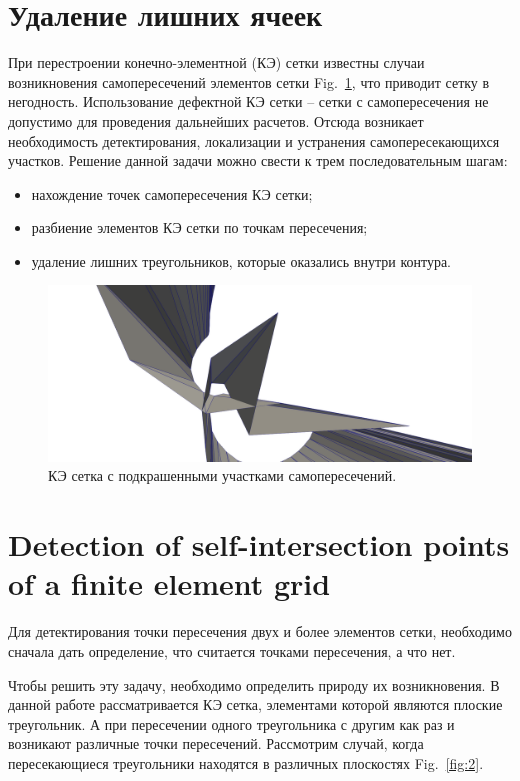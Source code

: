 \documentclass[
11pt,%
tightenlines,%
twoside,%
onecolumn,%
nofloats,%
nobibnotes,%
nofootinbib,%
superscriptaddress,%
noshowpacs,%
centertags]%
{revtex4}
\begin{document}
\section{Удаление лишних ячеек}

При перестроении конечно-элементной (КЭ) сетки известны случаи возникновения самопересечений элементов сетки Fig.~\ref{fig:1}, что приводит сетку в негодность. Использование дефектной КЭ сетки – сетки с самопересечения не допустимо для проведения дальнейших расчетов. Отсюда возникает необходимость детектирования, локализации и устранения самопересекающихся участков.
Решение данной задачи можно свести к трем последовательным шагам:

\begin{itemize}
  \item нахождение точек самопересечения КЭ сетки;
  \item разбиение элементов КЭ сетки по точкам пересечения;
  \item удаление лишних треугольников, которые оказались внутри контура.
\end{itemize}

\begin{figure}[h]
\includegraphics[width=1.0\textwidth]{pics/pic_1.png}
\caption{КЭ сетка с подкрашенными участками самопересечений.}\label{fig:1}
\end{figure}

\section{Detection of self-intersection points of a finite element grid}

Для детектирования точки пересечения двух и более элементов сетки, необходимо сначала дать определение, что считается точками пересечения, а что нет.

Чтобы решить эту задачу, необходимо определить природу их возникновения.
В данной работе рассматривается КЭ сетка, элементами которой являются плоские треугольник. А при пересечении одного треугольника с другим как раз и возникают различные точки пересечений.
Рассмотрим случай, когда пересекающиеся треугольники находятся в различных плоскостях Fig.~\ref{fig:2}. 
\end{document}
